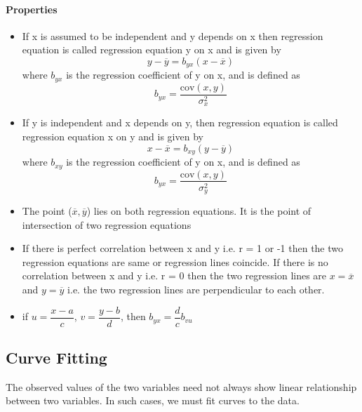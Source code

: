 \documentclass[
10pt, %
a4paper, %
]{report}
\begin{document}
\paragraph*{Properties}
\begin{itemize}
\item If x is assumed to be independent and y depends on x then regression equation is called regression equation y on x and is given by
\[y - \overline{y} = b_{yx} (x - \overline{x})\]
where \(b_{yx}\) is the regression coefficient of y on x, and is defined as
\[b_{yx} = \frac{\mathrm{cov}(x, y)}{\sigma_x^2}\]
\item If y is independent and x depends on y, then regression equation is called regression equation x on y and is given by
\[x - \overline{x} = b_{xy} (y - \overline{y})\]
where \(b_{xy}\) is the regression coefficient of y on x, and is defined as
\[b_{yx} = \frac{\mathrm{cov}(x, y)}{\sigma_y^2}\]
\item The point (\(\overline{x}, \overline{y}\)) lies on both regression equations. It is the point of intersection of two regression equations
\item If there is perfect correlation between x and y i.e. r = 1 or -1 then the two regression equations are same or regression lines coincide. If there is no correlation between x and y i.e. r = 0 then the two regression lines are \(x = \overline{x}\) and \(y = \overline{y}\) i.e. the two regression lines are perpendicular to each other.
\item if \(u =\dfrac{x-a}{c}\), \(v = \dfrac{y-b}{d}\), then \(b_{yx} = \dfrac{d}{c} b_{vu}\)
\end{itemize}

\subsection*{Curve Fitting}
The observed values of the two variables need not always show
linear relationship between two variables. In such cases, we must fit curves to the data.
\end{document}
